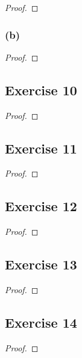 \documentclass[14pt]{extarticle}
\begin{document}
\begin{proof}

\end{proof}

\subsubsection{(b)}

\begin{proof}

\end{proof}

\subsection{Exercise 10}

\begin{proof}

\end{proof}

\subsection{Exercise 11}

\begin{proof}

\end{proof}

\subsection{Exercise 12}

\begin{proof}

\end{proof}

\subsection{Exercise 13}

\begin{proof}

\end{proof}

\subsection{Exercise 14}

\begin{proof}

\end{proof}
\end{document}
